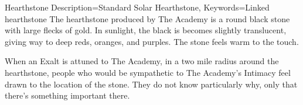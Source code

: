 \begin{Merit}{Hearthstone}{
    Description=Standard Solar Hearthstone,
    Keywords=Linked
}{hearthstone}
The hearthstone produced by The Academy is a round black stone with large
flecks of gold. In sunlight, the black is becomes slightly translucent, giving
way to deep reds, oranges, and purples. The stone feels warm to the touch.

When an Exalt is attuned to The Academy, in a two mile radius around the
hearthstone, people who would be sympathetic to The Academy's Intimacy feel
drawn to the location of the stone. They do not know particularly why, only
that there's something important there.
\end{Merit}


